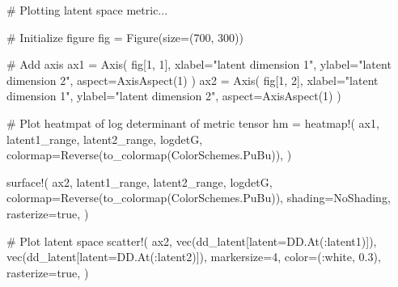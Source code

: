 \documentclass[
]{scrartcl}
\newenvironment{Shaded}{\begin{snugshade}}{\end{snugshade}}
\newcommand{\CommentTok}[1]{\textcolor[rgb]{0.37,0.37,0.37}{#1}}
\newcommand{\ConstantTok}[1]{\textcolor[rgb]{0.56,0.35,0.01}{#1}}
\newcommand{\FloatTok}[1]{\textcolor[rgb]{0.68,0.00,0.00}{#1}}
\newcommand{\FunctionTok}[1]{\textcolor[rgb]{0.28,0.35,0.67}{#1}}
\newcommand{\NormalTok}[1]{\textcolor[rgb]{0.00,0.23,0.31}{#1}}
\newcommand{\OperatorTok}[1]{\textcolor[rgb]{0.37,0.37,0.37}{#1}}
\newcommand{\StringTok}[1]{\textcolor[rgb]{0.13,0.47,0.30}{#1}}
\begin{document}
\begin{Shaded}
\begin{Highlighting}[]
\CommentTok{\# Plotting latent space metric...}

\CommentTok{\# Initialize figure}
\NormalTok{fig }\OperatorTok{=} \FunctionTok{Figure}\NormalTok{(size}\OperatorTok{=}\NormalTok{(}\FloatTok{700}\NormalTok{, }\FloatTok{300}\NormalTok{))}

\CommentTok{\# Add axis}
\NormalTok{ax1 }\OperatorTok{=} \FunctionTok{Axis}\NormalTok{(}
\NormalTok{    fig[}\FloatTok{1}\NormalTok{, }\FloatTok{1}\NormalTok{],}
\NormalTok{    xlabel}\OperatorTok{=}\StringTok{"latent dimension 1"}\NormalTok{,}
\NormalTok{    ylabel}\OperatorTok{=}\StringTok{"latent dimension 2"}\NormalTok{,}
\NormalTok{    aspect}\OperatorTok{=}\FunctionTok{AxisAspect}\NormalTok{(}\FloatTok{1}\NormalTok{)}
\NormalTok{)}
\NormalTok{ax2 }\OperatorTok{=} \FunctionTok{Axis}\NormalTok{(}
\NormalTok{    fig[}\FloatTok{1}\NormalTok{, }\FloatTok{2}\NormalTok{],}
\NormalTok{    xlabel}\OperatorTok{=}\StringTok{"latent dimension 1"}\NormalTok{,}
\NormalTok{    ylabel}\OperatorTok{=}\StringTok{"latent dimension 2"}\NormalTok{,}
\NormalTok{    aspect}\OperatorTok{=}\FunctionTok{AxisAspect}\NormalTok{(}\FloatTok{1}\NormalTok{)}
\NormalTok{)}

\CommentTok{\# Plot heatmpat of log determinant of metric tensor}
\NormalTok{hm }\OperatorTok{=} \FunctionTok{heatmap!}\NormalTok{(}
\NormalTok{    ax1,}
\NormalTok{    latent1\_range,}
\NormalTok{    latent2\_range,}
\NormalTok{    logdetG,}
\NormalTok{    colormap}\OperatorTok{=}\FunctionTok{Reverse}\NormalTok{(}\FunctionTok{to\_colormap}\NormalTok{(ColorSchemes.PuBu)),}
\NormalTok{)}

\FunctionTok{surface!}\NormalTok{(}
\NormalTok{    ax2,}
\NormalTok{    latent1\_range,}
\NormalTok{    latent2\_range,}
\NormalTok{    logdetG,}
\NormalTok{    colormap}\OperatorTok{=}\FunctionTok{Reverse}\NormalTok{(}\FunctionTok{to\_colormap}\NormalTok{(ColorSchemes.PuBu)),}
\NormalTok{    shading}\OperatorTok{=}\NormalTok{NoShading,}
\NormalTok{    rasterize}\OperatorTok{=}\ConstantTok{true}\NormalTok{,}
\NormalTok{)}

\CommentTok{\# Plot latent space}
\FunctionTok{scatter!}\NormalTok{(}
\NormalTok{    ax2,}
    \FunctionTok{vec}\NormalTok{(dd\_latent[latent}\OperatorTok{=}\NormalTok{DD.}\FunctionTok{At}\NormalTok{(}\OperatorTok{:}\NormalTok{latent1)]),}
    \FunctionTok{vec}\NormalTok{(dd\_latent[latent}\OperatorTok{=}\NormalTok{DD.}\FunctionTok{At}\NormalTok{(}\OperatorTok{:}\NormalTok{latent2)]),}
\NormalTok{    markersize}\OperatorTok{=}\FloatTok{4}\NormalTok{,}
\NormalTok{    color}\OperatorTok{=}\NormalTok{(}\OperatorTok{:}\NormalTok{white, }\FloatTok{0.3}\NormalTok{),}
\NormalTok{    rasterize}\OperatorTok{=}\ConstantTok{true}\NormalTok{,}
\NormalTok{)}


\end{Highlighting}
\end{Shaded}
\end{document}
